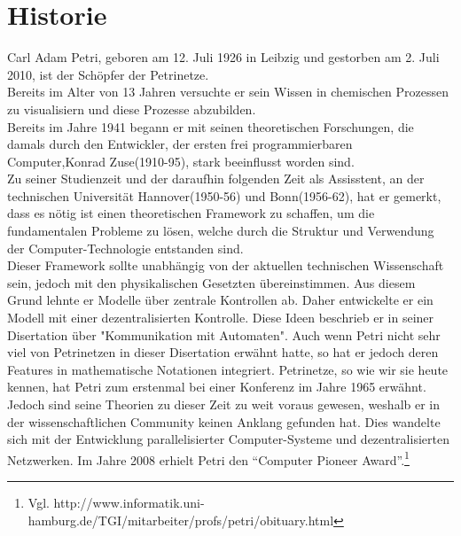 \section{Historie}
Carl Adam Petri, geboren am 12. Juli 1926 in Leibzig und gestorben am 2. Juli 2010, ist der Schöpfer der Petrinetze. \\
Bereits im Alter von 13 Jahren versuchte er sein Wissen in chemischen Prozessen zu visualisiern und diese Prozesse abzubilden.\\ 
Bereits im Jahre 1941 begann er mit seinen theoretischen Forschungen, die damals durch den Entwickler, der ersten frei programmierbaren Computer,Konrad Zuse(1910-95), stark beeinflusst worden sind.\\
Zu seiner Studienzeit und der daraufhin folgenden Zeit als Assisstent, an der technischen Universität Hannover(1950-56) und Bonn(1956-62), hat er gemerkt, dass es nötig ist einen theoretischen Framework zu schaffen, um die fundamentalen Probleme zu lösen, welche durch die Struktur und Verwendung der Computer-Technologie entstanden sind. \\
Dieser Framework sollte unabhängig von der aktuellen technischen Wissenschaft sein, jedoch mit den physikalischen Gesetzten übereinstimmen.
Aus diesem Grund lehnte er Modelle über zentrale Kontrollen ab. Daher entwickelte er ein Modell mit einer dezentralisierten Kontrolle.
Diese Ideen beschrieb er in seiner Disertation über "Kommunikation mit Automaten".
Auch wenn Petri nicht sehr viel von Petrinetzen in dieser Disertation erwähnt hatte, so hat er jedoch deren Features in mathematische Notationen integriert.
Petrinetze, so wie wir sie heute kennen, hat Petri zum erstenmal bei einer Konferenz im Jahre 1965 erwähnt. \\ Jedoch sind seine Theorien zu dieser Zeit zu weit voraus gewesen, weshalb er in der wissenschaftlichen Community keinen Anklang gefunden hat. Dies wandelte sich mit der Entwicklung parallelisierter Computer-Systeme und dezentralisierten Netzwerken. Im Jahre 2008 erhielt Petri den \enquote{Computer Pioneer Award}.\footnote{Vgl. http://www.informatik.uni-hamburg.de/TGI/mitarbeiter/profs/petri/obituary.html}
